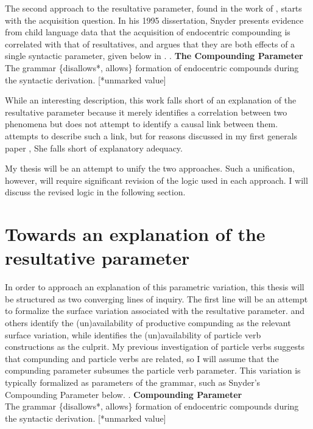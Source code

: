 \documentclass[letterpaper,12pt]{article}
\begin{document}
The second approach to the resultative parameter, found in the work of \textcite{snyder1995language,snyder2001nature,roeper2002learnability,beck2001complex}, starts with the acquisition question.
In his 1995 dissertation, Snyder presents evidence from child language data that the acquisition of endocentric compounding is correlated with that of resultatives, and argues that they are both effects of a single syntactic parameter, given below in \Next.
\ex. \textbf{The Compounding Parameter} \parencite{snyder2001nature}\\ 
The grammar \{disallows*, allows\} formation of endocentric compounds during the syntactic derivation. [*unmarked value] 

While an interesting description, this work falls short of an explanation of the resultative parameter because it merely identifies a correlation between two phenomena but does not attempt to identify a causal link between them.
\textcite{kratzer_building_2004} attempts to describe such a link, but for reasons discussed in my first generals paper \parencite[][pp 32-34]{milway2015generals}, She falls short of explanatory adequacy.

My thesis will be an attempt to unify the two approaches. 
Such a unification, however, will require significant revision of the logic used in each approach.
I will discuss the revised logic in the following section.

\section{Towards an explanation of the resultative parameter}\label{sec:outline}
In order to approach an explanation of this parametric variation, this thesis will be structured as two converging lines of inquiry.
The first line will be an attempt to formalize the surface variation associated with the resultative parameter.
\textcite{snyder2001nature,roeper2002learnability,kratzer_building_2004} and others identify the (un)availability of productive compunding as the relevant surface variation, while \textcite{haider2016predicting} identifies the (un)availability of particle verb constructions as the culprit.
My previous investigation of particle verbs \parencite[][included as an appendix]{milway2013forum} suggests that compunding and particle verbs are related, so I will assume that the compunding parameter subsumes the particle verb parameter.
This variation is typically formalized as parameters of the grammar, such as Snyder's Compounding Parameter below.
\ex. \textbf{Compounding Parameter} \parencite{snyder2001nature}\\ 
The grammar \{disallows*, allows\} formation of endocentric compounds during the syntactic derivation. [*unmarked value] 
\end{document}
